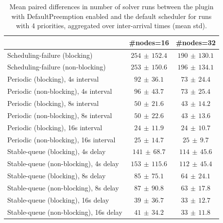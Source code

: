 \begin{table}[t]
\tiny
\setlength{\tabcolsep}{1.2pt}
\renewcommand{\arraystretch}{1.12}
\centering
\caption{Mean paired differences in number of solver runs between the plugin with DefaultPreemption enabled and the default scheduler for runs with 4 priorities, aggregated over inter-arrival times (mean \pm std).}
\label{tab:solver_runs-defpreempt1-prio4-std1-agg-arrival}
\begin{tabular}{l c c}
\toprule
 & \#nodes=16 & \#nodes=32 \\
\midrule
Scheduling-failure (blocking) & $254\,\pm\,152.4$ & $190\,\pm\,130.1$ \\
Scheduling-failure (non-blocking) & $253\,\pm\,150.6$ & $196\,\pm\,134.1$ \\
Periodic (blocking), 4s interval & $92\,\pm\,36.1$ & $73\,\pm\,24.4$ \\
Periodic (non-blocking), 4s interval & $96\,\pm\,43.7$ & $73\,\pm\,25.4$ \\
Periodic (blocking), 8s interval & $50\,\pm\,21.6$ & $43\,\pm\,14.2$ \\
Periodic (non-blocking), 8s interval & $50\,\pm\,22.6$ & $43\,\pm\,13.6$ \\
Periodic (blocking), 16s interval & $24\,\pm\,11.9$ & $24\,\pm\,10.7$ \\
Periodic (non-blocking), 16s interval & $25\,\pm\,14.7$ & $25\,\pm\,9.7$ \\
Stable-queue (blocking), 4s delay & $141\,\pm\,68.7$ & $114\,\pm\,45.6$ \\
Stable-queue (non-blocking), 4s delay & $153\,\pm\,115.6$ & $112\,\pm\,45.4$ \\
Stable-queue (blocking), 8s delay & $85\,\pm\,75.1$ & $64\,\pm\,24.1$ \\
Stable-queue (non-blocking), 8s delay & $87\,\pm\,90.8$ & $63\,\pm\,17.8$ \\
Stable-queue (blocking), 16s delay & $39\,\pm\,36.7$ & $33\,\pm\,12.7$ \\
Stable-queue (non-blocking), 16s delay & $41\,\pm\,34.2$ & $33\,\pm\,11.8$ \\
\bottomrule
\end{tabular}
\end{table}
